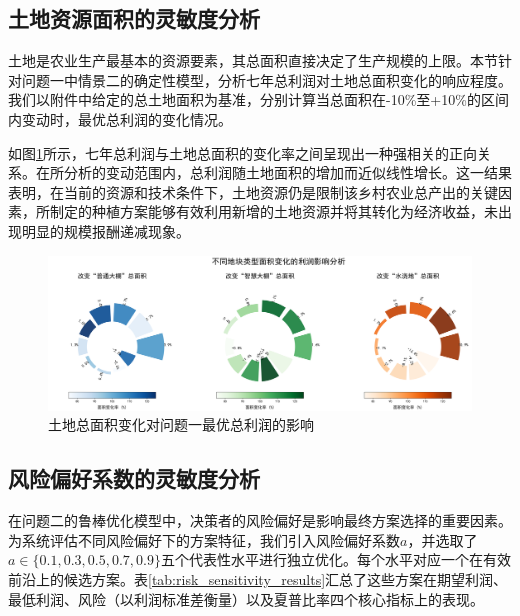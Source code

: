 \subsection{土地资源面积的灵敏度分析}

土地是农业生产最基本的资源要素，其总面积直接决定了生产规模的上限。本节针对问题一中情景二的确定性模型，分析七年总利润对土地总面积变化的响应程度。我们以附件中给定的总土地面积为基准，分别计算当总面积在-10\%至+10\%的区间内变动时，最优总利润的变化情况。

如图\ref{fig:land_sensitivity}所示，七年总利润与土地总面积的变化率之间呈现出一种强相关的正向关系。在所分析的变动范围内，总利润随土地面积的增加而近似线性增长。这一结果表明，在当前的资源和技术条件下，土地资源仍是限制该乡村农业总产出的关键因素，所制定的种植方案能够有效利用新增的土地资源并将其转化为经济收益，未出现明显的规模报酬递减现象。

\begin{figure}[H]
    \centering
    \includegraphics[width=\textwidth]{figs/6灵敏度分析/第一问地块灵敏度圆弧图.png}
    \caption{土地总面积变化对问题一最优总利润的影响}
    \label{fig:land_sensitivity}
\end{figure}


\subsection{风险偏好系数的灵敏度分析}

在问题二的鲁棒优化模型中，决策者的风险偏好是影响最终方案选择的重要因素。为系统评估不同风险偏好下的方案特征，我们引入风险偏好系数$a$，并选取了$a \in \{0.1, 0.3, 0.5, 0.7, 0.9\}$五个代表性水平进行独立优化。每个水平对应一个在有效前沿上的候选方案。表\ref{tab:risk_sensitivity_results}汇总了这些方案在期望利润、最低利润、风险（以利润标准差衡量）以及夏普比率\cite{SDCY202202002}四个核心指标上的表现。

